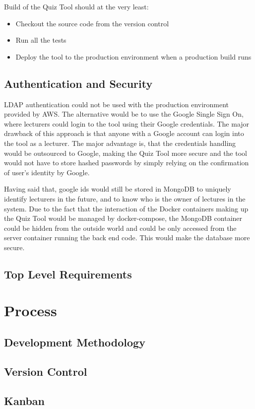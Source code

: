 Build of the Quiz Tool should at the very least:
\begin{itemize}
  \item Checkout the source code from the version control
  \item Run all the tests
  \item Deploy the tool to the production environment when a production build runs
\end{itemize}

\subsection{Authentication and Security}
LDAP authentication could not be used with the production environment provided by
AWS. The alternative would be to use the Google Single Sign On\cite{2}, where lecturers
could login to the tool using their Google credentials. The major drawback of this
approach is that anyone with a Google account can login into the tool as a lecturer.
The major advantage is, that the credentials handling would be outsourced to Google,
making the Quiz Tool more secure and the tool would not have to store hashed passwords
by simply relying on the confirmation of user's identity by Google.

Having said that, google ids would still be stored in MongoDB to uniquely identify
lecturers in the future, and to know who is the owner of lectures in the system.
Due to the fact that the interaction of the Docker containers making up the Quiz Tool would
be managed by docker-compose, the MongoDB container could be hidden from the outside world
and could be only accessed from the server container running the back end code. This would
make the database more secure.

\subsection{Top Level Requirements}



\section{Process}
\subsection{Development Methodology}

\subsection{Version Control}

\subsection{Kanban}

